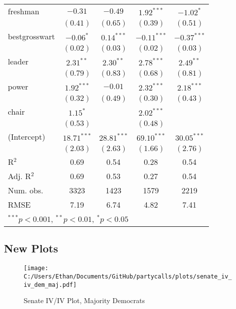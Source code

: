 \documentclass[12pt]{article}
\begin{document}
\begin{table}[H]
\begin{center}
\begin{tabular}{l c c c c }
			freshman               & $-0.31$       & $-0.49$       & $1.92^{***}$  & $-1.02^{*}$   \\
			& $(0.41)$      & $(0.65)$      & $(0.39)$      & $(0.51)$      \\
			bestgrosswart          & $-0.06^{*}$   & $0.14^{***}$  & $-0.11^{***}$ & $-0.37^{***}$ \\
			& $(0.02)$      & $(0.03)$      & $(0.02)$      & $(0.03)$      \\
			leader                 & $2.31^{**}$   & $2.30^{**}$   & $2.78^{***}$  & $2.49^{**}$   \\
			& $(0.79)$      & $(0.83)$      & $(0.68)$      & $(0.81)$      \\
			power                  & $1.92^{***}$  & $-0.01$       & $2.32^{***}$  & $2.18^{***}$  \\
			& $(0.32)$      & $(0.49)$      & $(0.30)$      & $(0.43)$      \\
			chair                  & $1.15^{*}$    &               & $2.02^{***}$  &               \\
			& $(0.53)$      &               & $(0.48)$      &               \\
			(Intercept)            & $18.71^{***}$ & $28.81^{***}$ & $69.10^{***}$ & $30.05^{***}$ \\
			& $(2.03)$      & $(2.63)$      & $(1.66)$      & $(2.76)$      \\
			\hline
			R$^2$                  & 0.69          & 0.54          & 0.28          & 0.54          \\
			Adj. R$^2$             & 0.69          & 0.53          & 0.27          & 0.54          \\
			Num. obs.              & 3323          & 1423          & 1579          & 2219          \\
			RMSE                   & 7.19          & 6.74          & 4.82          & 7.41          \\
			\hline
			\multicolumn{5}{l}{\scriptsize{$^{***}p<0.001$, $^{**}p<0.01$, $^*p<0.05$}}
		\end{tabular}
	\end{center}
\end{table}

\clearpage

\subsection{New Plots}

\begin{figure}[H]
	\centering
	\caption{Senate IV/IV Plot, Majority Democrats}
	\texttt{[image: C:/Users/Ethan/Documents/GitHub/partycalls/plots/senate\_iv\_iv\_dem\_maj.pdf]}
\end{figure}
\end{document}
